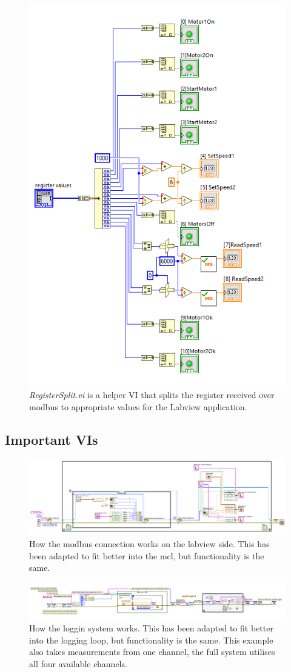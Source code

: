 \begin{figure}[H]
    \centering
    \includegraphics[width=0.5\linewidth]{vis/RegisterSplit.PNG}
    \caption{\textit{RegisterSplit.vi} is a helper VI that splits the register received over modbus to appropriate values for the Labview application.}
    \label{fig:RegisterSplit}
\end{figure}

\subsection{Important VIs}
\begin{figure}[H]
    \centering
    \includegraphics[width=0.75\linewidth]{vis/ModbusIO.PNG}
    \caption{How the modbus connection works on the labview side. This has been adapted to fit better into the \acrshort{mcl}, but functionality is the same.}
    \label{fig:ModbusIO}
\end{figure}

\begin{figure}[H]
    \centering
    \includegraphics[width=0.75\linewidth]{vis/LoggingSystem.PNG}
    \caption{How the loggin system works. This has been adapted to fit better into the logging loop, but functionality is the same. This example also takes measurements from one channel, the full system utilises all four available channels.}
    \label{fig:Logging}
\end{figure}